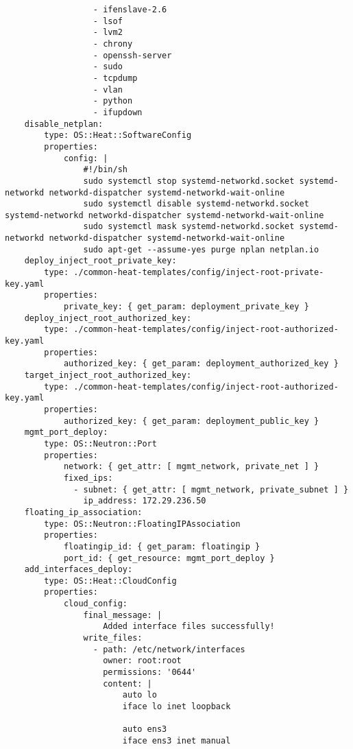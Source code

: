 \begin{verbatim}
                  - ifenslave-2.6
                  - lsof
                  - lvm2
                  - chrony
                  - openssh-server
                  - sudo
                  - tcpdump
                  - vlan
                  - python
                  - ifupdown
    disable_netplan:
        type: OS::Heat::SoftwareConfig
        properties:
            config: |
                #!/bin/sh
                sudo systemctl stop systemd-networkd.socket systemd-networkd networkd-dispatcher systemd-networkd-wait-online
                sudo systemctl disable systemd-networkd.socket systemd-networkd networkd-dispatcher systemd-networkd-wait-online
                sudo systemctl mask systemd-networkd.socket systemd-networkd networkd-dispatcher systemd-networkd-wait-online
                sudo apt-get --assume-yes purge nplan netplan.io
    deploy_inject_root_private_key:
        type: ./common-heat-templates/config/inject-root-private-key.yaml
        properties:
            private_key: { get_param: deployment_private_key }
    deploy_inject_root_authorized_key:
        type: ./common-heat-templates/config/inject-root-authorized-key.yaml
        properties:
            authorized_key: { get_param: deployment_authorized_key }
    target_inject_root_authorized_key:
        type: ./common-heat-templates/config/inject-root-authorized-key.yaml
        properties:
            authorized_key: { get_param: deployment_public_key }
    mgmt_port_deploy:
        type: OS::Neutron::Port
        properties:
            network: { get_attr: [ mgmt_network, private_net ] }
            fixed_ips:
              - subnet: { get_attr: [ mgmt_network, private_subnet ] }
                ip_address: 172.29.236.50
    floating_ip_association:
        type: OS::Neutron::FloatingIPAssociation
        properties:
            floatingip_id: { get_param: floatingip }
            port_id: { get_resource: mgmt_port_deploy }
    add_interfaces_deploy:
        type: OS::Heat::CloudConfig
        properties:
            cloud_config:
                final_message: |
                    Added interface files successfully!
                write_files:
                  - path: /etc/network/interfaces
                    owner: root:root
                    permissions: '0644'
                    content: |
                        auto lo
                        iface lo inet loopback

                        auto ens3
                        iface ens3 inet manual


\end{verbatim}
